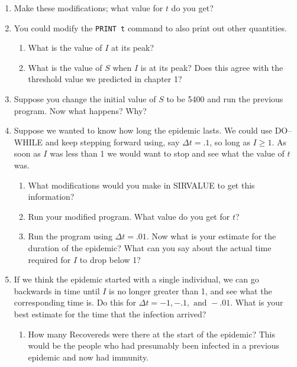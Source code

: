 \begin{enumerate}
\item Make these modifications; what value for $t$ do you get?


\item You could modify the {\tt PRINT t} command to also print out
other quantities.

  \begin{enumerate}
  \item What is the value of $I$ at its peak?

  \item What is the value of $S$ when $I$ is at its peak?  Does this
agree with the threshold value we predicted in chapter 1?


\end{enumerate}
\item Suppose you change the initial value of $S$ to be 5400 and run
the previous program.  Now what happens?  Why?


\item Suppose we wanted to know how long the epidemic lasts.  We could
use DO--WHILE and keep stepping forward using, say $\Delta t = .1$, so
long as $I \geq 1$.  As soon as $I$ was less than 1 we would want to
stop and see what the value of $t$ was.

  \begin{enumerate}
  \item What modifications would you make in SIRVALUE to get this
information?

  \item Run your modified program.  What value do you get for $t$?

  \item Run the program using $\Delta t = .01$.  Now what is your
estimate for the duration of the epidemic?  What can you say about the
actual time required for $I$ to drop below 1?


\end{enumerate}
\item If we think the epidemic started with a single individual, we
can go backwards in time until $I$ is no longer greater than 1, and
see what the corresponding time is.  Do this for $\Delta t = -1, -.1,
\mbox{ and } -.01$.  What is your best estimate for the time that the
infection arrived?

  \begin{enumerate}
  \item How many Recovereds were there at the start of the epidemic?
This would be the people who had presumably been infected in a
previous epidemic and now had immunity.


\end{enumerate}
\end{enumerate}
